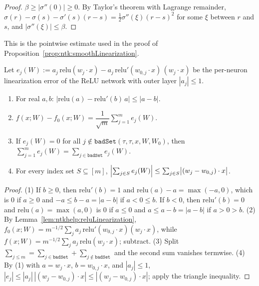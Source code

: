 \begin{proof}
  \leanok
$\beta\ge|\sigma''(0)|\ge0$. By Taylor's theorem with Lagrange remainder, $\sigma(r)-\sigma(s)-\sigma'(s)(r-s)=\tfrac12\sigma''(\xi)(r-s)^2$ for some $\xi$ between $r$ and $s$, and $|\sigma''(\xi)|\le\beta$.
\end{proof}

This is the pointwise estimate used in the proof of Proposition~\ref{prop:ntk:smoothLinearization}.

\begin{lemma}\label{lem:ntkhelp:reluError}
  \leanok
Let $e_j(W):=a_j\,\mathrm{relu}(w_j\cdot x)-a_j\,\mathrm{relu}'(w_{0,j}\cdot x)\,(w_j\cdot x)$ be the per-neuron linearization error of the ReLU network with outer layer $|a_j|\le1$.
\begin{enumerate}
  \item For real $a,b$: $\bigl|\mathrm{relu}(a)-\mathrm{relu}'(b)\,a\bigr|\le|a-b|$.
  \item $f(x;W)-f_0(x;W)=\dfrac1{\sqrt m}\sum_{j=1}^me_j(W)$.
  \item If $e_j(W)=0$ for all $j\notin\texttt{badSet}(\tau,\tau,x,W,W_0)$, then $\sum_{j=1}^me_j(W)=\sum_{j\in\texttt{badSet}}e_j(W)$.
  \item For every index set $S\subseteq[m]$,
  $\Bigl|\sum_{j\in S}e_j(W)\Bigr|\le\sum_{j\in S}\bigl|(w_j-w_{0,j})\cdot x\bigr|$.
\end{enumerate}
\end{lemma}

\begin{proof}
  \leanok
(1) If $b\ge0$, then $\mathrm{relu}'(b)=1$ and $\mathrm{relu}(a)-a=\max(-a,0)$, which is $0$ if $a\ge0$ and $-a\le b-a=|a-b|$ if $a<0\le b$. If $b<0$, then $\mathrm{relu}'(b)=0$ and $\mathrm{relu}(a)=\max(a,0)$ is $0$ if $a\le0$ and $a\le a-b=|a-b|$ if $a>0>b$.
(2) By Lemma~\ref{lem:ntkhelp:reluLinearization}, $f_0(x;W)=m^{-1/2}\sum_ja_j\,\mathrm{relu}'(w_{0,j}\cdot x)(w_j\cdot x)$, while $f(x;W)=m^{-1/2}\sum_ja_j\,\mathrm{relu}(w_j\cdot x)$; subtract.
(3) Split $\sum_{j\le m}=\sum_{j\in\texttt{badSet}}+\sum_{j\notin\texttt{badSet}}$ and the second sum vanishes termwise.
(4) By (1) with $a=w_j\cdot x$, $b=w_{0,j}\cdot x$, and $|a_j|\le1$, $|e_j|\le|a_j|\,|(w_j-w_{0,j})\cdot x|\le|(w_j-w_{0,j})\cdot x|$; apply the triangle inequality.
\end{proof}

